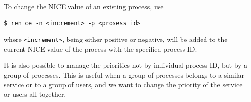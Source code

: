 To change the NICE value of an existing process, use
\begin{lstlisting}
$ renice -n <increment> -p <prosess id>
\end{lstlisting}
where \verb|<increment>|, being either positive or negative, will be added to the current NICE value of the process with the specified process ID.

It is also possible to manage the priorities not by individual process ID, but by a group of processes. This is useful when a group of processes belongs to a similar service or to a group of users, and we want to change the priority of the service or users all together.














